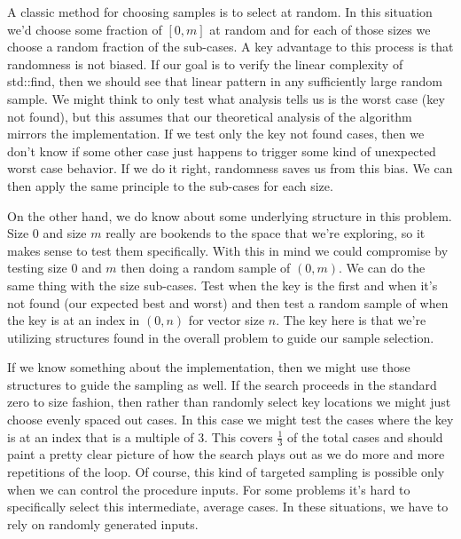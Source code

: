\documentclass[]{tufte-handout}
\begin{document}
A classic method for choosing samples is to select at random. In this situation we'd choose some fraction of $[0,m]$ at random and for each of those sizes we choose a random fraction of the sub-cases. A key advantage to this process is that randomness is not biased.  If our goal is to verify the linear complexity of std::find, then we should see that linear pattern in any sufficiently large random sample. We might think to only test what analysis tells us is the worst case (key not found), but this assumes that our theoretical analysis of the algorithm mirrors the implementation. If we test only the key not found cases, then we don't know if some other case just happens to trigger some kind of unexpected worst case behavior. If we do it right, randomness saves us from this bias. We can then apply the same principle to the sub-cases for each size.

On the other hand, we do know about some underlying structure in this problem.  Size 0 and size $m$ really are bookends to the space that we're exploring, so it makes sense to test them specifically.  With this in mind we could compromise by testing size 0 and $m$ then doing a random sample of $(0,m)$. We can do the same thing with the size sub-cases. Test when the key is the first and when it's not found (our expected best and worst) and then test a random sample of when the key is at an index in $(0,n)$ for vector size $n$. The key here is that we're utilizing structures found in the overall problem to guide our sample selection.

If we know something about the implementation, then we might use those structures to guide the sampling as well. If the search proceeds in the standard zero to size fashion, then rather than randomly select key locations we might just choose evenly spaced out cases. In this case we might test the cases where the key is at an index that is a multiple of $3$. This covers $\frac{1}{3}$ of the total cases and should paint a pretty clear picture of how the search plays out as we do more and more repetitions of the loop.  Of course, this kind of targeted sampling is possible only when we can control the procedure inputs.  For some problems it's hard to specifically select this intermediate, average cases. In these situations, we have to rely on randomly generated inputs.
\end{document}
